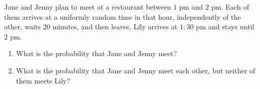Jane and Jenny plan to meet at a restaurant between $1$ pm and $2$ pm. Each of them arrives at a uniformly random time in that hour, independently of the other, waits $20$ minutes, and then leaves. Lily arrives at $1{:}30$ pm and stays until $2$ pm.
\begin{enumerate}
\item[(a)] What is the probability that Jane and Jenny meet?
\item[(b)] What is the probability that Jane and Jenny meet each other, but neither of them meets Lily?
\end{enumerate}
